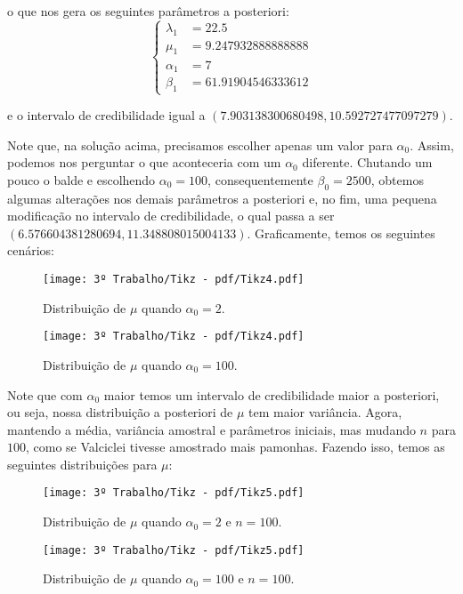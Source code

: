 \documentclass{article}
\begin{document}
\noindent o que nos gera os seguintes parâmetros a posteriori:
\begin{equation*}
    \left\{
        \begin{array}{ll}
            \lambda_1 & = 22.5 \\
            \mu_1 & = 9.247932888888888 \\
            \alpha_1 & = 7 \\
            \beta_1 & = 61.91904546333612
        \end{array}
    \right.
\end{equation*}

\noindent e o intervalo de credibilidade igual a $(7.903138300680498, 10.592727477097279)$.

Note que, na solução acima, precisamos escolher apenas um valor para $\alpha_0$. Assim, podemos nos perguntar o que aconteceria com um $\alpha_0$ diferente. Chutando um pouco o balde e escolhendo $\alpha_0 = 100$, consequentemente $\beta_0 = 2500$, obtemos algumas alterações nos demais parâmetros a posteriori e, no fim, uma pequena modificação no intervalo de credibilidade, o qual passa a ser $(6.576604381280694, 11.348808015004133)$. Graficamente, temos os seguintes cenários:
\begin{multicols}{2}
    \begin{figure}[H]
        \texttt{[image: 3º Trabalho/Tikz - pdf/Tikz4.pdf]}
        \caption{Distribuição de $\mu$ quando $\alpha_0 = 2$.}
    \end{figure}
    \begin{figure}[H]
        \texttt{[image: 3º Trabalho/Tikz - pdf/Tikz4.pdf]}
        \caption{Distribuição de $\mu$ quando $\alpha_0 = 100$.}
    \end{figure}
\end{multicols}

Note que com $\alpha_0$ maior temos um intervalo de credibilidade maior a posteriori, ou seja, nossa distribuição a posteriori de $\mu$ tem maior variância. Agora, mantendo a média, variância amostral e parâmetros iniciais, mas mudando $n$ para $100$, como se Valciclei tivesse amostrado mais pamonhas. Fazendo isso, temos as seguintes distribuições para $\mu$:
\begin{multicols}{2}
    \begin{figure}[H]
        \texttt{[image: 3º Trabalho/Tikz - pdf/Tikz5.pdf]}
        \caption{Distribuição de $\mu$ quando $\alpha_0 = 2$ e $n = 100$.}
    \end{figure}
    \begin{figure}[H]
        \texttt{[image: 3º Trabalho/Tikz - pdf/Tikz5.pdf]}
        \caption{Distribuição de $\mu$ quando $\alpha_0 = 100$ e $n = 100$.}
    \end{figure}
\end{multicols}
\end{document}
